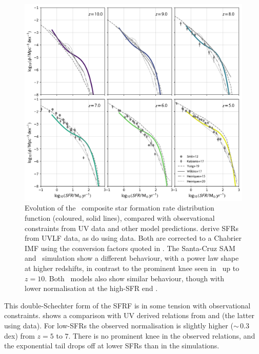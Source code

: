 \begin{figure}
	\includegraphics[width=\textwidth]{images/sfrf_multi_both.png}
        \caption{Evolution of the \flares\ composite star formation rate distribution function (coloured, solid lines), compared with observational constraints from UV data and other model predictions.
				\protect\cite{smit_star_2012} derive SFRs from UVLF data, as do \protect\cite{katsianis_evolution_2017} using \protect\cite{bouwens_uv_2015} data.
				Both are corrected to a Chabrier IMF using the conversion factors quoted in \protect\cite{kennicutt_jr_star_2012}.
				The Santa-Cruz SAM \protect\citep[][dashed line]{yung_semi-analytic_2019} and \bluetides\ simulation \protect\citep{wilkins_properties_2017} show a different behaviour, with a power law shape at higher redshifts, in contrast to the prominent knee seen in \flares\ up to $z = 10$.
				Both \lgals\ models also show similar behaviour, though with lower normalisation at the high-SFR end \citep{henriques_galaxy_2015,henriques_l-galaxies_2020}.
				}
        \label{fig:sfrf_multi_both}
\end{figure}


This double-Schechter form of the SFRF is in some tension with observational constraints.
 shows a comparison with UV derived relations from \cite{smit_star_2012} and \cite{katsianis_evolution_2017} (the latter using \citealt{bouwens_uv_2015} data).
For low-SFRs the observed normalisation is slightly higher ($\sim \, 0.3$ dex) from $z = 5$ to $7$.
There is no prominent knee in the observed relations, and the exponential tail drops off at lower SFRs than in the simulations.

